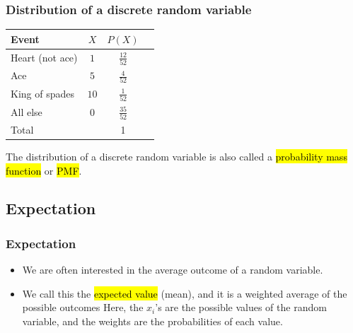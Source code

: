 \documentclass[slidestop,compress,mathserif]{beamer}
\begin{document}
\begin{frame}
\frametitle{Distribution of a discrete random variable}


\pause
\begin{small}
\begin{center}
\renewcommand{\arraystretch}{1.5}
\begin{tabular}{l | c | c | c }
Event		& $X$ 		& $P(X)$        		 \\
\hline
Heart (not ace)	& $1$		& $\frac{12}{52}$	 \\
Ace			& $5$		& $\frac{4}{52}$	 \\	
King of spades	& $10$		& $\frac{1}{52}$	 \\	
All else		& $0$		& $\frac{35}{52}$	\\
\hline
Total			&			&		1		
\end{tabular}

\end{center}
\end{small}

\pause

The distribution of a discrete random variable is also called a \hl{probability mass function} or \hl{PMF}.
\end{frame}



\subsection{Expectation}


\begin{frame}
\frametitle{Expectation}

\begin{itemize}

\item We are often interested in the average outcome of a random variable.

\item We call this the \hl{expected value} (mean), and it is a weighted average of the possible outcomes
\formula{\[\mu = E(X) = \sum_{i = 1}^k x_i ~ P(X = x_i)\]}
Here, the $x_i$'s are the possible values of the random variable, and the weights are the probabilities of each value.
\pause
{}
\end{itemize}

\end{frame}
\end{document}
